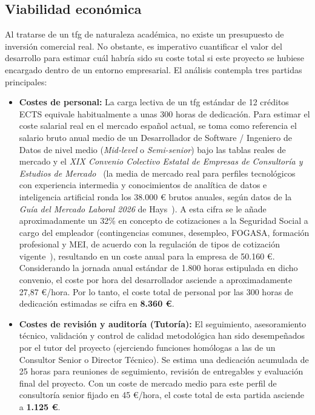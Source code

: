 \subsection{Viabilidad económica}
Al tratarse de un \acrshort{tfg} de naturaleza académica, no existe un
presupuesto de inversión comercial real. No obstante, es imperativo cuantificar
el valor del desarrollo para estimar cuál habría sido su coste total si este
proyecto se hubiese encargado dentro de un entorno empresarial. El análisis
contempla tres partidas principales:

\begin{itemize}
    \item \textbf{Costes de personal:} La carga lectiva de un \acrshort{tfg} estándar de 12 créditos ECTS equivale habitualmente a unas 300 horas de dedicación. Para estimar el coste salarial real en el mercado español actual, se toma como referencia el salario bruto anual medio de un Desarrollador de Software / Ingeniero de Datos de nivel medio (\textit{Mid-level} o \textit{Semi-senior}) bajo las tablas reales de mercado y el \textit{XIX Convenio Colectivo Estatal de Empresas de Consultoría y Estudios de Mercado}~\cite{BoeConvenioTIC} (la media de mercado real para perfiles tecnológicos con experiencia intermedia y conocimientos de analítica de datos e inteligencia artificial ronda los 38.000 € brutos anuales, según datos de la \textit{Guía del Mercado Laboral 2026} de Hays~\cite{HaysGuia2026}). A esta cifra se le añade aproximadamente un 32\% en concepto de cotizaciones a la Seguridad Social a cargo del empleador (contingencias comunes, desempleo, FOGASA, formación profesional y MEI, de acuerdo con la regulación de tipos de cotización vigente~\cite{BoeCotizaciones2026}), resultando en un coste anual para la empresa de 50.160 €. Considerando la jornada anual estándar de 1.800 horas estipulada en dicho convenio, el coste por hora del desarrollador asciende a aproximadamente 27,87 €/hora. Por lo tanto, el coste total de personal por las 300 horas de dedicación estimadas se cifra en \textbf{8.360 €}.
    \item \textbf{Costes de revisión y auditoría (Tutoría):} El seguimiento, asesoramiento técnico, validación y control de calidad metodológica han sido desempeñados por el tutor del proyecto (ejerciendo funciones homólogas a las de un Consultor Senior o Director Técnico). Se estima una dedicación acumulada de 25 horas para reuniones de seguimiento, revisión de entregables y evaluación final del proyecto. Con un coste de mercado medio para este perfil de consultoría senior fijado en 45 €/hora, el coste total de esta partida asciende a \textbf{1.125 €}.

\end{itemize}
